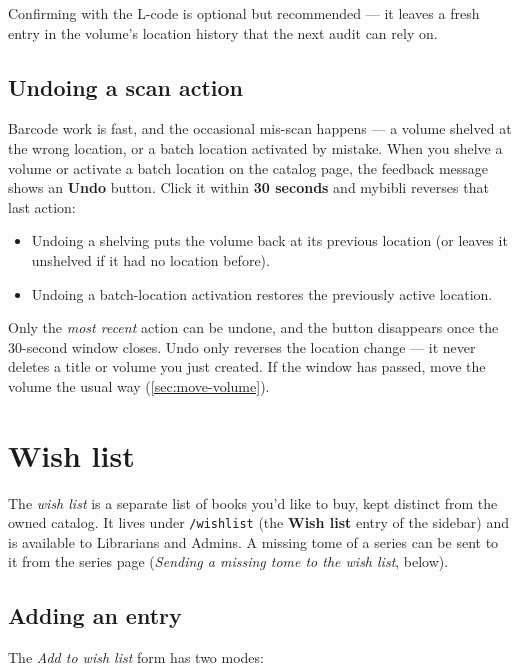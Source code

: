Confirming with the L-code is optional but recommended — it leaves
a fresh entry in the volume's location history that the next audit
can rely on.

\subsection{Undoing a scan action}\label{sec:scan-undo}

Barcode work is fast, and the occasional mis-scan happens — a volume
shelved at the wrong location, or a batch location activated by
mistake. When you shelve a volume or activate a batch location on the
catalog page, the feedback message shows an \textbf{Undo} button.
Click it within \textbf{30 seconds} and mybibli reverses that last
action:

\begin{itemize}
  \item Undoing a shelving puts the volume back at its previous
        location (or leaves it unshelved if it had no location before).
  \item Undoing a batch-location activation restores the previously
        active location.
\end{itemize}

Only the \emph{most recent} action can be undone, and the button
disappears once the 30-second window closes. Undo only reverses the
location change — it never deletes a title or volume you just
created. If the window has passed, move the volume the usual way
(\autoref{sec:move-volume}).

\section{Wish list}\label{sec:wishlist}

The \emph{wish list} is a separate list of books
you'd like to buy, kept distinct from the owned catalog. It lives
under \texttt{/wishlist} (the \textbf{Wish list} entry
of the sidebar) and is available to Librarians and Admins.
A missing tome of a series can be sent to it from the series page
(\emph{Sending a missing tome to the wish list}, below).

\subsection{Adding an entry}

The \emph{Add to wish list} form has two modes:


